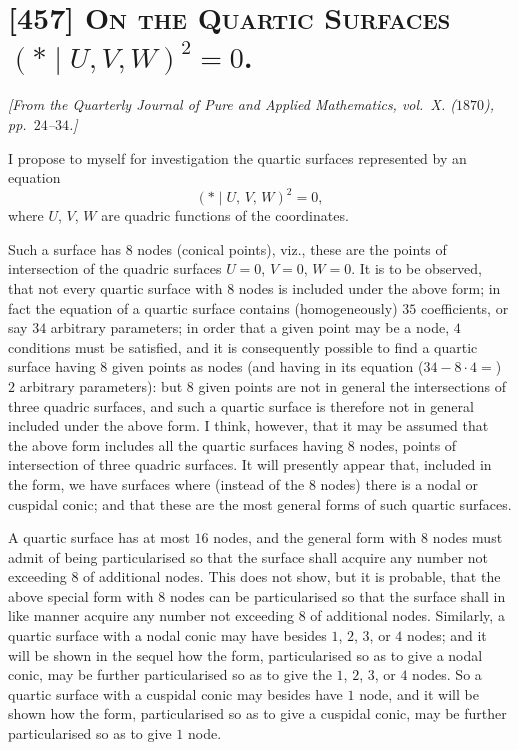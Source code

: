 \documentclass[11pt,a4paper]{article}
\providecommand{\midbar}{\mid}
\begin{document}
\section*{[457] \textsc{On the Quartic Surfaces $(*\!\midbar\! U, V, W)^{2} = 0$.}}

\begin{center}
\textit{[From the Quarterly Journal of Pure and Applied Mathematics,
vol.\ X. ($1870$), pp.\ $24$--$34$.]}
\end{center}

\medskip

I propose to myself for investigation the quartic surfaces represented by an
equation
\[
(*\!\midbar\! U,\,V,\,W)^{2} = 0,
\]
where $U$, $V$, $W$ are quadric functions of the coordinates.

Such a surface has $8$ nodes (conical points), viz., these are the points of
intersection of the quadric surfaces $U = 0$, $V = 0$, $W = 0$. It is to be
observed, that not every quartic surface with $8$ nodes is included under
the above form; in fact the equation of a quartic surface contains
(homogeneously) $35$ coefficients, or say $34$ arbitrary parameters; in
order that a given point may be a node, $4$ conditions must be satisfied,
and it is consequently possible to find a quartic surface having $8$ given
points as nodes (and having in its equation ($34 - 8 \cdot 4 =$) $2$
arbitrary parameters): but $8$ given points are not in general the
intersections of three quadric surfaces, and such a quartic surface is
therefore not in general included under the above form. I think, however,
that it may be assumed that the above form includes all the quartic
surfaces having $8$ nodes, points of intersection of three quadric
surfaces. It will presently appear that, included in the form, we have
surfaces where (instead of the $8$ nodes) there is a nodal or cuspidal
conic; and that these are the most general forms of such quartic surfaces.

A quartic surface has at most $16$ nodes, and the general form with $8$
nodes must admit of being particularised so that the surface shall acquire
any number not exceeding $8$ of additional nodes. This does not show, but
it is probable, that the above special form with $8$ nodes can be
particularised so that the surface shall in like manner acquire any number
not exceeding $8$ of additional nodes. Similarly, a quartic surface with
a nodal conic may have besides $1$, $2$, $3$, or $4$ nodes; and it will be
shown in the sequel how the form, particularised so as to give a nodal
conic, may be further particularised so as to give the $1$, $2$, $3$, or
$4$ nodes. So a quartic surface with a cuspidal conic may besides have
$1$ node, and it will be shown how the form, particularised so as to give
a cuspidal conic, may be further particularised so as to give $1$ node.
\end{document}

